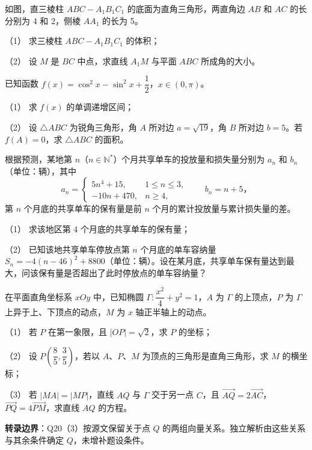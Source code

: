 \Needspace{0.4\textheight}
\begin{question}
如图，直三棱柱 $ABC-A_1B_1C_1$ 的底面为直角三角形，两直角边 $AB$ 和 $AC$ 的长分别为 4 和 2，侧棱 $AA_1$ 的长为 5。

（1） 求三棱柱 $ABC-A_1B_1C_1$ 的体积；

（2） 设 $M$ 是 $BC$ 中点，求直线 $A_1M$ 与平面 $ABC$ 所成角的大小。
\nopagebreak[4]
\begin{center}\end{center}
\nopagebreak[4]
\end{question}
\begin{question}
已知函数 $f(x)=\cos^2x-\sin^2x+\dfrac12$，$x\in(0,\pi)$。

（1） 求 $f(x)$ 的单调递增区间；

（2） 设 $\triangle ABC$ 为锐角三角形，角 $A$ 所对边 $a=\sqrt{19}$，角 $B$ 所对边 $b=5$。若 $f(A)=0$，求 $\triangle ABC$ 的面积。

\end{question}
\begin{question}
根据预测，某地第 $n$（$n\in\mathbb N^*$）个月共享单车的投放量和损失量分别为 $a_n$ 和 $b_n$（单位：辆），其中
\nopagebreak[4]
\[
a_n=
\begin{cases}
5n^4+15,&1\leqslant n\leqslant3,\\
-10n+470,&n\geqslant4,
\end{cases}
\qquad b_n=n+5\text{，}
\]
第 $n$ 个月底的共享单车的保有量是前 $n$ 个月的累计投放量与累计损失量的差。

（1） 求该地区第 4 个月底的共享单车的保有量；

（2） 已知该地共享单车停放点第 $n$ 个月底的单车容纳量 $S_n=-4(n-46)^2+8800$（单位：辆）。设在某月底，共享单车保有量达到最大，问该保有量是否超出了此时停放点的单车容纳量？

\end{question}
\begin{question}
在平面直角坐标系 $xOy$ 中，已知椭圆 $\Gamma:\dfrac{x^2}{4}+y^2=1$，$A$ 为 $\Gamma$ 的上顶点，$P$ 为 $\Gamma$ 上异于上、下顶点的动点，$M$ 为 $x$ 轴正半轴上的动点。

（1） 若 $P$ 在第一象限，且 $|OP|=\sqrt2$，求 $P$ 的坐标；

（2） 设 $P\left(\dfrac85,\dfrac35\right)$，若以 $A\text{、}P\text{、}M$ 为顶点的三角形是直角三角形，求 $M$ 的横坐标；

（3） 若 $|MA|=|MP|$，直线 $AQ$ 与 $\Gamma$ 交于另一点 $C$，且 $\overrightarrow{AQ}=2\overrightarrow{AC}$，$\overrightarrow{PQ}=4\overrightarrow{PM}$，求直线 $AQ$ 的方程。

\begin{gktip}
\textbf{转录边界}：Q20（3）按源文保留关于点 $Q$ 的两组向量关系。独立解析由这些关系与其余条件确定 $Q$，未增补题设条件。
\end{gktip}

\end{question}
